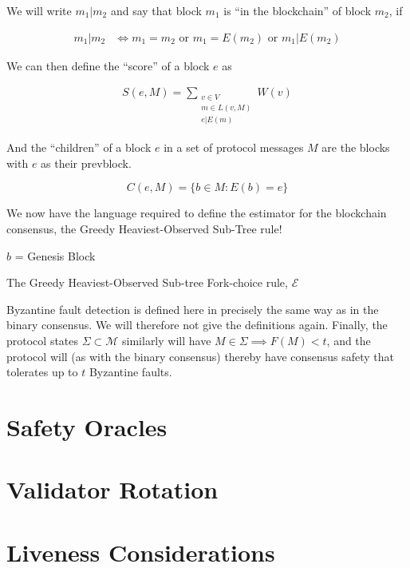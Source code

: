 \documentclass{article}
\theoremstyle{definition}
\begin{document}
We will write $m_1 | m_2$ and say that block $m_1$ is ``in the blockchain'' of block $m_2$, if 

\begin{align}
	m_1 | m_2 &\iff m_1 = m_2 \text{ or } m_1 = E(m_2) \text{ or } m_1 | E(m_2) 
\end{align}

We can then define the ``score'' of a block $e$ as

\begin{align}
S(e, M) = \sum_{\substack{v \in V \\ m \in L(v,M) \\ e|E(m)}} W(v)
\end{align}

And the ``children'' of a block $e$ in a set of protocol messages $M$ are the blocks with $e$ as their prevblock.

$$
C(e,M) = \{b \in M : E(b) = e\}
$$

We now have the language required to define the estimator for the blockchain consensus, the Greedy Heaviest-Observed Sub-Tree rule!

\begin{algorithm}[H]
 $b$ = Genesis Block


\caption{The Greedy Heaviest-Observed Sub-tree Fork-choice rule, $\mathcal{E}$}
\end{algorithm}

Byzantine fault detection is defined here in precisely the same way as in the binary consensus. We will therefore not give the definitions again. Finally, the protocol states $\Sigma \subset \mathcal{M}$ similarly will have $M \in \Sigma \implies F(M) < t$, and the protocol will (as with the binary consensus) thereby have consensus safety that tolerates up to $t$ Byzantine faults.

\section{Safety Oracles}

\section{Validator Rotation}

\section{Liveness Considerations}
\end{document}
